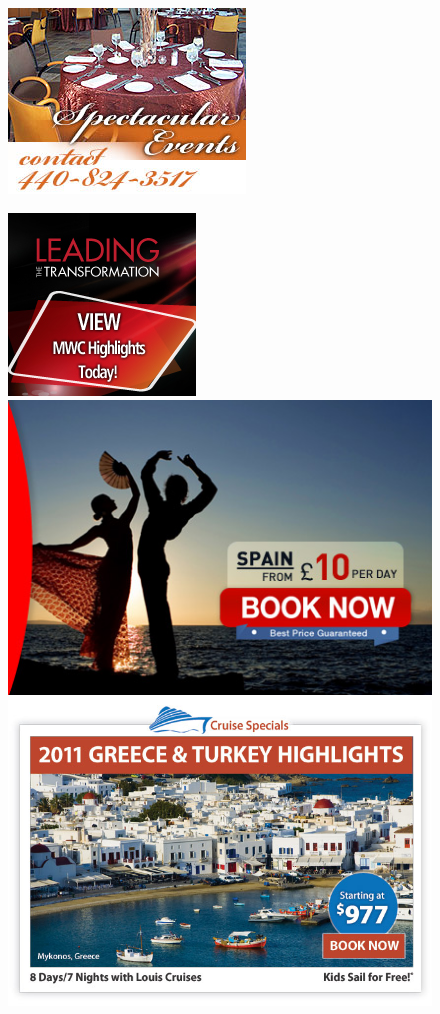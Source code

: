 \begin{figure}[h!]
	\includegraphics[height=0.19\textheight]{related_work/figs/icdar11_img_30.png}

	\vspace{1.5mm}
	
	\includegraphics[height=0.16\textheight]{dataset_samples/icdar11/img_138.jpg}
	\includegraphics[height=0.16\textheight]{dataset_samples/icdar11/img_89.jpg}
	\includegraphics[height=0.16\textheight]{related_work/figs/icdar11_img_64.jpg}


\end{figure}

